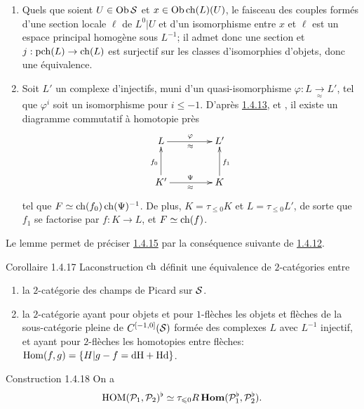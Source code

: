 \documentclass[10pt]{../fichiers-configuration-latex/smfart}
\begin{document}
\begin{enumerate}
\renewcommand{\theenumi}{\Roman{enumi}}
\renewcommand{\labelenumi}{(\theenumi)}
\item Quels que soient $U\in \operatorname{Ob} {\mathcal S}$ et $x\in \operatorname{Ob} \operatorname{ch}(L)(U)$,
le faisceau des couples formés d'une section locale $\ell$ de
$L^{0}|U$ et d'un isomorphisme entre $x$ et $\ell$ est un espace
principal homogène sous $L^{-1}$; il admet donc une section et
$j:\operatorname{pch}(L)\rightarrow \operatorname{ch}(L)$ est surjectif sur les classes
d'isomorphies d'objets, donc une équivalence.

\item Soit $L'$ un complexe d'injectifs, muni d'un quasi-isomorphisme
$\varphi:L{\xrightarrow[\approx]{}}L'$, tel que $\varphi^{i}$ soit un
isomorphisme pour $i\leq -1$. D'après \hyperref[XVIII.lem1.4.13]{1.4.13}, et
\cite{SGA4-18:9}, il existe un diagramme commutatif à homotopie près
$$
\xymatrix@R=1cm@C=1.5cm{
L  \ar[r]^{\varphi}_{\approx} & L'\\
K' \ar[u]^{f_0}  \ar[r]^{\Psi}_{\approx}   & K\ar[u]_{f_1}
}
$$
tel que $F\simeq \operatorname{ch}(f_{0})\operatorname{ch}(\Psi)^{-1}$. De plus, $K=\tau_{\leq
0}K$ et $L=\tau_{\leq 0}L'$, de sorte que $f_{1}$ se factorise par
$f:K\rightarrow L$, et $F\simeq \operatorname{ch}(f)$.
\end{enumerate}

Le lemme permet de préciser \hyperref[XVIII.prop1.4.15]{1.4.15} par la conséquence
suivante de \hyperref[XVIII.subsubsec1.4.12]{1.4.12}.

\begin{enonce*}{Corollaire 1.4.17}
La\pageoriginale construction $\operatorname{ch}$ définit une équivalence de $2$-catégories entre
\begin{enumerate}
\renewcommand{\theenumi}{\alph{enumi}}
\renewcommand{\labelenumi}{\theenumi)}
\item la $2$-catégorie des champs de Picard sur ${\mathcal S}$.

\item la $2$-catégorie ayant pour objets et pour $1$-flèches les
objets et flèches de la sous-catégorie pleine de
$C^{[-1,0]}({\mathcal S})$ formée des complexes $L$ avec $L^{-1}$
injectif, et ayant pour $2$-flèches les homotopies entre flèches:
$\operatorname{Hom}(f,g)=\{H|g-f=\text{\rm dH}+\text{\rm Hd}\}$.
\end{enumerate}
\end{enonce*}

\begin{enonce*}[remark]{Construction 1.4.18}
On a
$$
\operatorname{HOM}({\mathcal P}_{1}, {\mathcal P}_{2})^{\flat}\simeq \tau_{\leqslant
0}R\operatorname{\mathbf{Hom}} ({\mathcal P}^{\flat}_{1}, {\mathcal P}^{\flat}_{2}){}.
$$
\end{enonce*}
\end{document}
